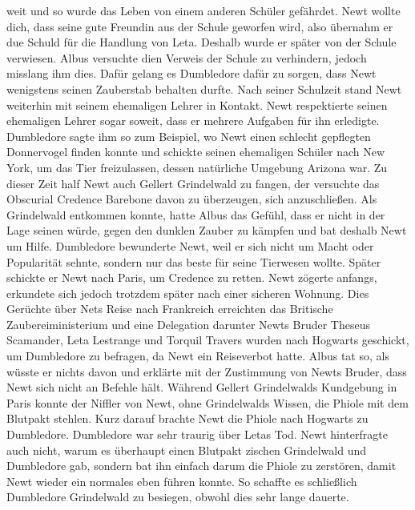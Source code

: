 \documentclass[a4paper, 10pt]{article}
\begin{document}
weit und so wurde das Leben von einem anderen Schüler gefährdet. Newt wollte dich, dass seine gute Freundin aus der Schule geworfen wird, also übernahm er due Schuld für die Handlung von Leta. Deshalb wurde er später von der Schule verwiesen. Albus versuchte dien Verweis der Schule zu verhindern, jedoch misslang ihm dies. Dafür gelang es Dumbledore dafür zu sorgen, dass Newt wenigstens seinen Zauberstab behalten durfte. Nach seiner Schulzeit stand Newt weiterhin mit seinem ehemaligen Lehrer in Kontakt. Newt respektierte seinen ehemaligen Lehrer sogar soweit, dass er mehrere Aufgaben für ihn erledigte. Dumbledore sagte ihm so zum Beispiel, wo Newt einen schlecht gepflegten Donnervogel finden konnte und schickte seinen ehemaligen Schüler nach New York, um das Tier freizulassen, dessen natürliche Umgebung Arizona war. Zu dieser Zeit half Newt auch Gellert Grindelwald zu fangen, der versuchte das Obscurial Credence Barebone davon zu überzeugen, sich anzuschließen. Als Grindelwald entkommen konnte, hatte Albus das Gefühl, dass er nicht in der Lage seinen würde, gegen den dunklen Zauber zu kämpfen und bat deshalb Newt um Hilfe. Dumbledore bewunderte Newt, weil er sich nicht um Macht oder Popularität sehnte, sondern nur das beste für seine Tierwesen wollte. Später schickte er Newt nach Paris, um Credence zu retten. Newt zögerte anfangs, erkundete sich jedoch trotzdem später nach einer sicheren Wohnung. Dies Gerüchte über Nets Reise nach Frankreich erreichten das Britische Zaubereiministerium und eine Delegation darunter Newts Bruder Theseus Scamander, Leta Lestrange und Torquil Travers wurden nach Hogwarts geschickt, um Dumbledore zu befragen, da Newt ein Reiseverbot hatte. Albus tat so, als wüsste er nichts davon und erklärte mit der Zustimmung von Newts Bruder, dass Newt sich nicht an Befehle hält. Während Gellert Grindelwalds Kundgebung in Paris konnte der Niffler von Newt, ohne Grindelwalds Wissen, die Phiole mit dem Blutpakt stehlen. Kurz darauf brachte Newt die Phiole nach Hogwarts zu Dumbledore. Dumbledore war sehr traurig über Letas Tod. Newt hinterfragte auch nicht, warum es überhaupt einen Blutpakt zischen Grindelwald und Dumbledore gab, sondern bat ihn einfach darum die Phiole zu zerstören, damit Newt wieder ein normales eben führen konnte. So schaffte es schließlich Dumbledore Grindelwald zu besiegen, obwohl dies sehr lange dauerte.
\end{document}
